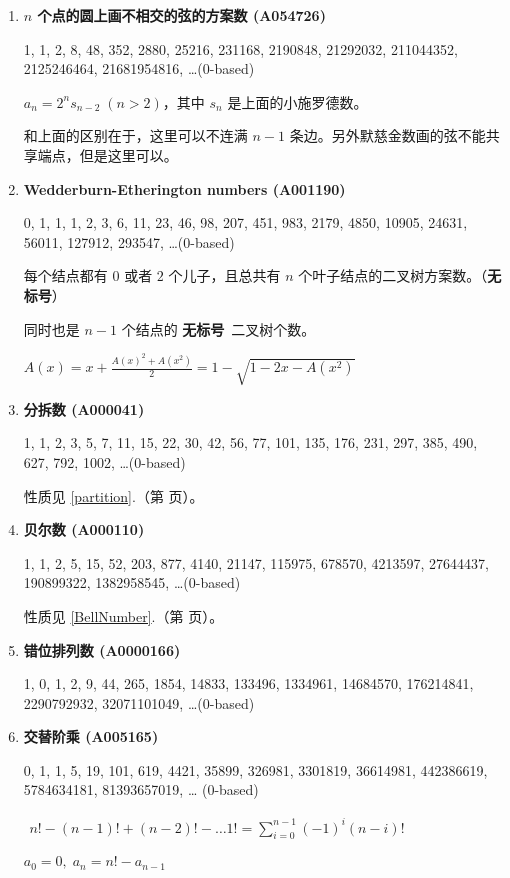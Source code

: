 \documentclass[a4paper, twoside]{article}
\newcommand\detailedref[1]{\ref{#1}.\nameref{#1}（第 \pageref{#1} 页）}
\begin{document}
\begin{enumerate}
        \item \textbf{$n$ 个点的圆上画不相交的弦的方案数 (A054726)}
        \label{A054726}

        1, 1, 2, 8, 48, 352, 2880, 25216, 231168, 2190848, 21292032, 211044352, 2125246464, 21681954816, \dots \;(0-based)

        $ a_n = 2^n s_{n - 2} \; (n > 2) $，其中 $s_n$ 是上面的小施罗德数。

        和上面的区别在于，这里可以不连满 $n-1$ 条边。另外默慈金数画的弦不能共享端点，但是这里可以。

        \item \textbf{Wedderburn-Etherington numbers (A001190)}

        0, 1, 1, 1, 2, 3, 6, 11, 23, 46, 98, 207, 451, 983, 2179, 4850, 10905, 24631, 56011, 127912, 293547, \dots \;(0-based)

        每个结点都有 $0$ 或者 $2$ 个儿子，且总共有 $n$ 个叶子结点的二叉树方案数。（\textbf{无标号}）

        同时也是 $n-1$ 个结点的 \textbf{无标号}\ 二叉树个数。

        $ A(x) = x + \frac {A(x) ^ 2 + A(x ^ 2)} 2 = 1 - \sqrt{1 - 2x - A(x ^ 2)} $

        \item \textbf{分拆数 (A000041)}

        1, 1, 2, 3, 5, 7, 11, 15, 22, 30, 42, 56, 77, 101, 135, 176, 231, 297, 385, 490, 627, 792, 1002, \dots \;(0-based)

        性质见 \detailedref{partition}。

        \item \textbf{贝尔数 (A000110)}

        1, 1, 2, 5, 15, 52, 203, 877, 4140, 21147, 115975, 678570, 4213597, 27644437, 190899322, 1382958545, \dots \;(0-based)

        性质见 \detailedref{BellNumber}。

        \item \textbf{错位排列数 (A0000166)}

        1, 0, 1, 2, 9, 44, 265, 1854, 14833, 133496, 1334961, 14684570, 176214841, 2290792932, 32071101049, \dots \;(0-based)

        \item \textbf{交替阶乘 (A005165)}

        0, 1, 1, 5, 19, 101, 619, 4421, 35899, 326981, 3301819, 36614981, 442386619, 5784634181, 81393657019, \dots \; (0-based)

        $ \begin{aligned} n! - (n - 1)! + (n - 2)! - \dots 1! = \sum_{i = 0} ^ {n - 1} (-1)^i (n - i)! \end{aligned} $

        $ a_0 = 0,\; a_n = n! - a_{n - 1} $

    \end{enumerate}
\end{document}

